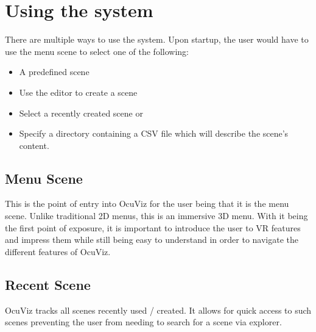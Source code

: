 \documentclass[a4paper,12pt]{article}
\begin{document}
\section{Using the system}

There are multiple ways to use the system. Upon startup, the user would have to use the menu scene to select one of the following:

\begin{itemize}
\item A predefined scene
\item Use the editor to create a scene
\item Select a recently created scene or
\item Specify a directory containing a CSV file which will describe the scene's content.
\end{itemize}

\subsection{Menu Scene}
This is the point of entry into OcuViz for the user being that it is the menu scene. Unlike traditional 2D menus, this is an immersive 3D menu. With it being the first point of exposure, it is important to introduce the user to VR features and impress them while still being easy to understand in order to navigate the different features of OcuViz.


\subsection{Recent Scene}
OcuViz tracks all scenes recently used / created. It allows for quick access to such scenes preventing the user from needing to search for a scene via explorer.
\end{document}
